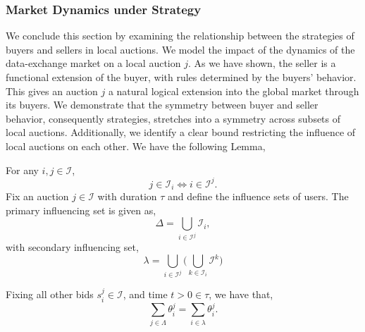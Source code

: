 \documentclass[sigconf, anonymous]{acmart}
\newcommand{\mcI}{\mathcal{I}}
\theoremstyle{definition}
\begin{document}
\subsubsection{Market Dynamics under Strategy}

We conclude this section by examining the relationship between the strategies of buyers and
sellers in local auctions. We model the impact of the dynamics of the
data-exchange market on a local auction $j$. As we have shown, the seller
is a functional extension of the buyer, with rules determined by the buyers'
behavior. This gives an auction $j$ a natural logical extension into the
global market through its buyers. We demonstrate that the symmetry between
buyer and seller behavior, consequently strategies, stretches into a symmetry across subsets of local
auctions. Additionally, we identify a clear bound restricting the influence of
local auctions on each other. We have the following Lemma,
{
\label{userunion}
For any $i,j\in \mcI$, 
\begin{equation}\label{jtoi}
j\in\mcI_i \Leftrightarrow i\in\mcI^j.
\end{equation}
Fix an auction $j\in\mcI$ with duration $\tau$ and define the influence sets of users. 
The primary influencing set is given as,
\begin{equation}\label{lambda}
    \Delta = \displaystyle\bigcup_{i\in\mcI^j} \mcI_i,
\end{equation}
with secondary influencing set,
\begin{equation}\label{llambda}
    \lambda = \bigcup_{i\in\mcI^j} \bigg(\bigcup_{k\in\mcI_i} \mcI^k \bigg)
\end{equation}
\iffalse
(THE SELLERS ALL THE BUYERS IN $j$ HAVE IN COMMON! i.e. $j$ AND...)
\begin{equation}%
    \Lambda = \displaystyle\bigcap_{i\in\mcI^j} \mcI_i,
\end{equation}
(THE COLLECTION OF BUYERS FROM EACH $i$ THAT ARE COMMON ACROSS ALL THE $i$'s SELLER
POOLS)
\begin{equation}%
    \lambda = \bigcup_{i\in\mcI^j} \bigg(\bigcap_{k\in\mcI_i} \mcI^k \bigg)
\end{equation}
\fi
Fixing all other bids $s_i^j \in \mcI$, and time $t>0\in\tau$, we have that,
\begin{equation}\label{union-eq}
    \displaystyle\sum_{j\in\Lambda} \theta_i^j = \sum_{i\in\lambda} \theta_i^j.
\end{equation}
}\\
\end{document}

